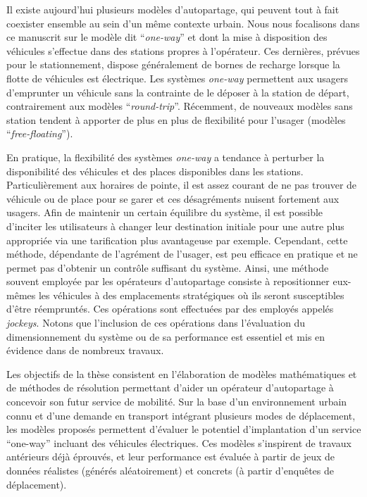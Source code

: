 \medskip
Il existe aujourd'hui plusieurs modèles d'autopartage, qui peuvent tout à fait coexister ensemble au sein d'un même contexte urbain. %
Nous nous focalisons dans ce manuscrit sur le modèle dit ``\emph{one-way}'' et dont la mise à disposition des véhicules s'effectue dans des stations propres à l'opérateur.
Ces dernières, prévues pour le stationnement, dispose généralement de bornes de recharge lorsque la flotte de véhicules est électrique.
Les systèmes \emph{one-way} permettent aux usagers d’emprunter un véhicule sans la contrainte de le déposer à la station de départ, contrairement aux modèles ``\emph{round-trip}''.
Récemment, de nouveaux modèles sans station tendent à apporter de plus en plus de flexibilité pour l'usager (modèles ``\emph{free-floating}'').

\medskip
En pratique, la flexibilité des systèmes \emph{one-way} a tendance à perturber la disponibilité des véhicules et des places disponibles dans les stations.
Particulièrement aux horaires de pointe, il est assez courant de ne pas trouver de véhicule ou de place pour se garer et ces désagréments nuisent fortement aux usagers.
Afin de maintenir un certain équilibre du système, il est possible d'inciter les utilisateurs à changer leur destination initiale pour une autre plus appropriée via une tarification plus avantageuse par exemple.
Cependant, cette méthode, dépendante de l'agrément de l'usager, est peu efficace en pratique et ne permet pas d'obtenir un contrôle suffisant du système.
Ainsi, une méthode souvent employée par les opérateurs d’autopartage consiste à repositionner eux-mêmes les véhicules à des emplacements stratégiques où ils seront susceptibles d’être réempruntés.
Ces opérations sont effectuées par des employés appelés \emph{jockeys}.
Notons que l'inclusion de ces opérations dans l’évaluation du dimensionnement du système ou de sa performance est essentiel et mis en évidence dans de nombreux travaux.

\medskip
Les objectifs de la thèse consistent en l'élaboration de modèles mathématiques et de méthodes de résolution permettant d'aider un opérateur d'autopartage à concevoir son futur service de mobilité.
Sur la base d'un environnement urbain connu et d'une demande en transport intégrant plusieurs modes de déplacement, les modèles proposés permettent d'évaluer le potentiel d'implantation d'un service ``one-way'' incluant des véhicules électriques.
Ces modèles s'inspirent de travaux antérieurs déjà éprouvés, et leur performance est évaluée à partir de jeux de données réalistes (générés aléatoirement) et concrets (à partir d'enquêtes de déplacement).

